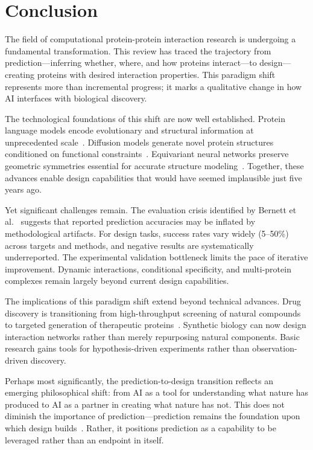 
\section{Conclusion}
\label{sec:conclusion}

The field of computational protein-protein interaction research is undergoing a fundamental transformation. This review has traced the trajectory from prediction---inferring whether, where, and how proteins interact---to design---creating proteins with desired interaction properties. This paradigm shift represents more than incremental progress; it marks a qualitative change in how AI interfaces with biological discovery.

The technological foundations of this shift are now well established. Protein language models encode evolutionary and structural information at unprecedented scale~\cite{rives2021esm1b,lin2023esm2}. Diffusion models generate novel protein structures conditioned on functional constraints~\cite{watson2023rfdiffusion,ingraham2023chroma}. Equivariant neural networks preserve geometric symmetries essential for accurate structure modeling~\cite{jing2021gvp,fuchs2020se3transformer}. Together, these advances enable design capabilities that would have seemed implausible just five years ago.

Yet significant challenges remain. The evaluation crisis identified by Bernett et al.~\cite{bernett2024bias} suggests that reported prediction accuracies may be inflated by methodological artifacts. For design tasks, success rates vary widely (5--50\%) across targets and methods, and negative results are systematically underreported. The experimental validation bottleneck limits the pace of iterative improvement. Dynamic interactions, conditional specificity, and multi-protein complexes remain largely beyond current design capabilities.

The implications of this paradigm shift extend beyond technical advances. Drug discovery is transitioning from high-throughput screening of natural compounds to targeted generation of therapeutic proteins~\cite{zambaldi2024alphaproteo,trepte2024ai}. Synthetic biology can now design interaction networks rather than merely repurposing natural components. Basic research gains tools for hypothesis-driven experiments rather than observation-driven discovery.

Perhaps most significantly, the prediction-to-design transition reflects an emerging philosophical shift: from AI as a tool for understanding what nature has produced to AI as a partner in creating what nature has not. This does not diminish the importance of prediction---prediction remains the foundation upon which design builds~\cite{jumper2021alphafold,dauparas2022proteinmpnn}. Rather, it positions prediction as a capability to be leveraged rather than an endpoint in itself.

